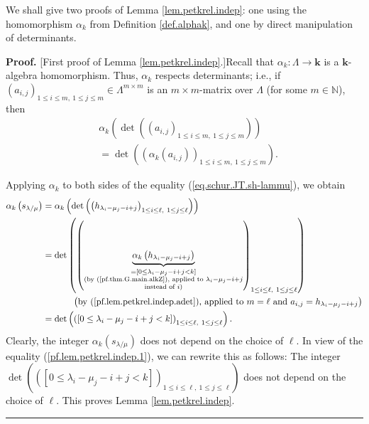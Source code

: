 \documentclass[numbers=enddot,12pt,final,onecolumn,notitlepage]{scrartcl}%
\theoremstyle{definition}
\newenvironment{proof}[1][Proof]{\noindent\textbf{#1.} }{\ \rule{0.5em}{0.5em}}
\newenvironment{verlong}{}{}
\begin{document}
\begin{verlong}
We shall give two proofs of Lemma \ref{lem.petkrel.indep}: one using the
homomorphism $\alpha_{k}$ from Definition \ref{def.alphak}, and one by direct
manipulation of determinants.

\begin{proof}
[First proof of Lemma \ref{lem.petkrel.indep}.]Recall that $\alpha_{k}%
:\Lambda\rightarrow\mathbf{k}$ is a $\mathbf{k}$-algebra homomorphism. Thus,
$\alpha_{k}$ respects determinants; i.e., if $\left(  a_{i,j}\right)  _{1\leq
i\leq m,\ 1\leq j\leq m}\in\Lambda^{m\times m}$ is an $m\times m$-matrix over
$\Lambda$ (for some $m\in\mathbb{N}$), then%
\begin{align}
&  \alpha_{k}\left(  \det\left(  \left(  a_{i,j}\right)  _{1\leq i\leq
m,\ 1\leq j\leq m}\right)  \right) \nonumber\\
&  =\det\left(  \left(  \alpha_{k}\left(  a_{i,j}\right)  \right)  _{1\leq
i\leq m,\ 1\leq j\leq m}\right)  . \label{pf.lem.petkrel.indep.adet}%
\end{align}


Applying $\alpha_{k}$ to both sides of the equality
(\ref{eq.schur.JT.sh-lammu}), we obtain%
\begin{align}
\alpha_{k}\left(  s_{\lambda/\mu}\right)   &  =\alpha_{k}\left(  \det\left(
\left(  h_{\lambda_{i}-\mu_{j}-i+j}\right)  _{1\leq i\leq\ell,\ 1\leq
j\leq\ell}\right)  \right) \nonumber\\
&  =\det\left(  \left(  \underbrace{\alpha_{k}\left(  h_{\lambda_{i}-\mu
_{j}-i+j}\right)  }_{\substack{=\left[  0\leq\lambda_{i}-\mu_{j}-i+j<k\right]
\\\text{(by (\ref{pf.thm.G.main.alkZ}), applied to }\lambda_{i}-\mu
_{j}-i+j\\\text{instead of }i\text{)}}}\right)  _{1\leq i\leq\ell,\ 1\leq
j\leq\ell}\right) \nonumber\\
&  \ \ \ \ \ \ \ \ \ \ \left(  \text{by (\ref{pf.lem.petkrel.indep.adet}),
applied to }m=\ell\text{ and }a_{i,j}=h_{\lambda_{i}-\mu_{j}-i+j}\right)
\nonumber\\
&  =\det\left(  \left(  \left[  0\leq\lambda_{i}-\mu_{j}-i+j<k\right]
\right)  _{1\leq i\leq\ell,\ 1\leq j\leq\ell}\right)  .
\label{pf.lem.petkrel.indep.1}%
\end{align}
Clearly, the integer $\alpha_{k}\left(  s_{\lambda/\mu}\right)  $ does not
depend on the choice of $\ell$. In view of the equality
(\ref{pf.lem.petkrel.indep.1}), we can rewrite this as follows: The integer
\newline$\det\left(  \left(  \left[  0\leq\lambda_{i}-\mu_{j}-i+j<k\right]
\right)  _{1\leq i\leq\ell,\ 1\leq j\leq\ell}\right)  $ does not depend on the
choice of $\ell$. This proves Lemma \ref{lem.petkrel.indep}.
\end{proof}


\end{verlong}
\end{document}
